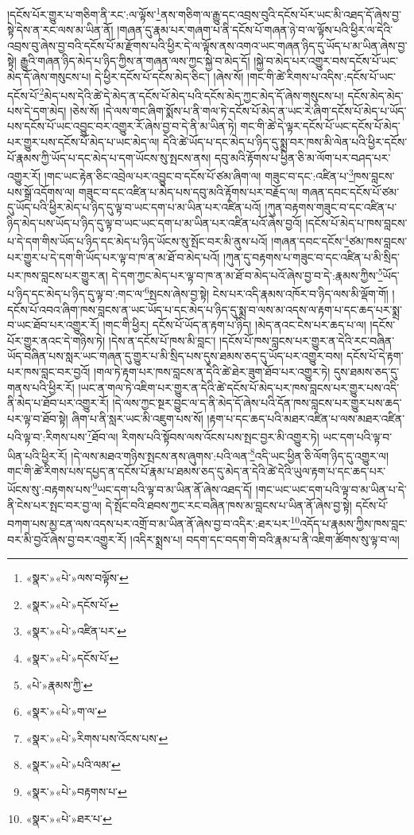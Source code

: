 །དངོས་པོར་གྱུར་པ་གཅིག་ནི་རང་:ལ་ལྟོས་\footnote{«སྣར་»«པེ་»ལས་བལྟོས་}ནས་གཅིག་ལ་རྒྱུ་དང་འབྲས་བུའི་དངོས་པོར་ཡང་མི་འཐད་དོ་ཞེས་བྱ་སྟེ་དེས་ན་རང་ལས་མ་ཡིན་ནོ། །གཞན་དུ་རྣམ་པར་གཞག་པ་ནི་དངོས་པོ་གཞན་ཉེ་བ་ལ་ལྟོས་པའི་ཕྱིར་ལ་དེའི་འབྲས་བུ་ཞེས་བྱ་བའི་དངོས་པོ་མ་རྫོགས་པའི་ཕྱིར་དེ་ལ་ལྟོས་ནས་འགའ་ཡང་གཞན་ཉིད་དུ་ཡོད་པ་མ་ཡིན་ཞེས་བྱ་སྟེ། རྒྱུའི་གཞན་ཉིད་མེད་པ་ཉིད་ཀྱིས་ན་གཞན་ལས་ཀྱང་སྐྱེ་བ་མེད་དོ། །སྐྱེ་བ་མེད་པར་འགྱུར་བས་དངོས་པོ་ཡང་མེད་དོ་ཞེས་གསུངས་པ། དེ་ཕྱིར་དངོས་པོ་དངོས་མེད་ཅིང་། །ཞེས་སོ། །གང་གི་ཚེ་རིགས་པ་འདིས་:དངོས་པོ་ཡང་དངོས་པོ་\footnote{«སྣར་»«པེ་»དངོས་པོ་}མེད་པས་དེའི་ཚེ་དེ་མེད་ན་དངོས་པོ་མེད་པའི་དངོས་མེད་ཀྱང་མེད་དོ་ཞེས་གསུངས་པ། དངོས་མེད་མེད་པས་དེ་དག་མེད། །ཅེས་སོ། །དེ་ལས་གང་ཞིག་སྨོས་པ་ནི་གལ་ཏེ་དངོས་པོ་མེད་ན་ཡང་རེ་ཞིག་དངོས་པོ་མེད་པ་ཡོད་པས་དངོས་པོ་ཡང་འབྱུང་བར་འགྱུར་རོ་ཞེས་བྱ་བ་དེ་ནི་མ་ཡིན་ཏེ། གང་གི་ཚེ་དེ་ལྟར་དངོས་པོ་ཡང་དངོས་པོ་མེད་པར་གྱུར་པས་དངོས་པོ་མེད་པ་ཡང་མེད་ལ། དེའི་ཚེ་ཡོད་པ་དང་མེད་པ་ཉིད་དུ་སྨྲ་བར་ཁས་མི་ལེན་པའི་ཕྱིར་དངོས་པོ་རྣམས་ཀྱི་ཡོད་པ་དང་མེད་པ་དག་ཡོངས་སུ་སྤངས་ནས། དབུ་མའི་རྟོགས་པ་ཕྱིན་ཅི་མ་ལོག་པར་བཤད་པར་འགྱུར་རོ། །གང་ཡང་རྟེན་ཅིང་འབྲེལ་པར་འབྱུང་བ་དངོས་པོ་ཙམ་ཞིག་ལ། གཟུང་བ་དང་:འཛིན་པ་\footnote{«སྣར་»«པེ་»འཛིན་པར་}ཁས་བླངས་པས་སྒྲོ་འདོགས་ལ། གཟུང་བ་དང་འཛིན་པ་མེད་པས་དབུ་མའི་རྟོགས་པར་བརྗོད་ལ། གཞན་དབང་དངོས་པོ་ཙམ་དུ་ཡོད་པའི་ཕྱིར་མེད་པ་ཉིད་དུ་ལྟ་བ་ཡང་དག་པ་མ་ཡིན་པར་འཛིན་པའོ། །ཀུན་བརྟགས་གཟུང་བ་དང་འཛིན་པ་ཉིད་མེད་པས་ཡོད་པ་ཉིད་དུ་ལྟ་བ་ཡང་ཡང་དག་པ་མ་ཡིན་པར་འཛིན་པའོ་ཞེས་བྱའོ། །དངོས་པོ་མེད་པ་ཁས་བླངས་པ་དེ་དག་གིས་ཡོད་པ་ཉིད་དང་མེད་པ་ཉིད་ཡོངས་སུ་སྤོང་བར་མི་ནུས་པའོ། །གཞན་དབང་དངོས་\footnote{«སྣར་»«པེ་»དངོས་པོ་}ཙམ་ཁས་བླངས་པར་གྱུར་པ་དེ་དག་གི་ཡོད་པར་ལྟ་བ་ཁ་ན་མ་ཐོ་བ་མེད་པའོ། །ཀུན་དུ་བརྟགས་པ་གཟུང་བ་དང་འཛིན་པ་མི་སྲིད་པར་ཁས་བླངས་པར་གྱུར་ན། དེ་དག་ཀྱང་མེད་པར་ལྟ་བ་ཁ་ན་མ་ཐོ་བ་མེད་པའོ་ཞེས་བྱ་བ་དེ་:རྣམས་ཀྱིས་\footnote{«པེ་»རྣམས་ཀྱི་}ཡོད་པ་ཉིད་དང་མེད་པ་ཉིད་དུ་ལྟ་བ་:གང་ལ་\footnote{«སྣར་»«པེ་»ག་ལ་}སྤངས་ཞེས་བྱ་སྟེ། ངེས་པར་འདི་རྣམས་འཁོར་བ་ཉིད་ལས་མི་ལྡོག་གོ། །དངོས་པོ་འབའ་ཞིག་ཁས་བླངས་ན་ཡང་ཡོད་པ་དང་མེད་པ་ཉིད་དུ་སྨྲ་བ་ལས་མ་འདས་ལ་རྟག་པ་དང་ཆད་པར་སྨྲ་བ་ཡང་ཐོབ་པར་འགྱུར་རོ། །གང་གི་ཕྱིར། དངོས་པོ་ཡོད་ན་རྟག་པ་ཉིད། །མེད་ནའང་ངེས་པར་ཆད་པ་ལ། །དངོས་པོར་གྱུར་ནའང་དེ་གཉིས་ཏེ། །དེས་ན་དངོས་པོ་ཁས་མི་བླང་། །དངོས་པོ་ཁས་བླངས་པར་གྱུར་ན་དེའི་རང་བཞིན་ཡོད་བཞིན་པས་སླར་ཡང་གཞན་དུ་གྱུར་པ་མི་སྲིད་པས་དུས་ཐམས་ཅད་དུ་ཡོད་པར་འགྱུར་བས། དངོས་པོ་དེ་རྟག་པར་ཁས་བླང་བར་བྱའོ། །གལ་ཏེ་རྟག་པར་ཁས་བླངས་ན་དེའི་ཚེ་ཐེར་ཟུག་ཐོབ་པར་འགྱུར་ཏེ། དུས་ཐམས་ཅད་དུ་གནས་པའི་ཕྱིར་རོ། །ཡང་ན་གལ་ཏེ་འཇིག་པར་གྱུར་ན་དེའི་ཚེ་དངོས་པོ་མེད་པར་ཁས་བླངས་པར་གྱུར་པས་འདི་ནི་མེད་པ་ཐོབ་པར་འགྱུར་རོ། །དེ་ལས་ཀྱང་སྔར་བྱུང་ལ་ད་ནི་མེད་དོ་ཞེས་པའི་དོན་ཁས་བླངས་པར་གྱུར་པས་ཆད་པར་ལྟ་བ་ཐོབ་སྟེ། ཞིག་པ་ནི་སླར་ཡང་མི་འཇུག་པས་སོ། །རྟག་པ་དང་ཆད་པའི་མཐར་འཛིན་པ་ལས་མཐར་འཛིན་པའི་ལྟ་བ་:རིགས་པས་\footnote{«སྣར་»«པེ་»རིགས་པས་འོངས་པས་}ཐོབ་ལ། རིགས་པའི་སྟོབས་ལས་འོངས་པས་སྤང་བྱར་མི་འགྱུར་ཏེ། ཡང་དག་པའི་ལྟ་བ་ཡིན་པའི་ཕྱིར་རོ། །དེ་ལས་མཐའ་གཉིས་སྤངས་ནས་ཞུགས་:པའི་ལན་\footnote{«སྣར་»«པེ་»པའི་ལམ་}འདི་ཡང་ཕྱིན་ཅི་ལོག་ཉིད་དུ་འགྱུར་ལ། གང་གི་ཚེ་རིགས་པས་དཔྱད་ན་དངོས་པོ་རྣམ་པ་ཐམས་ཅད་དུ་མེད་ན་དེའི་ཚེ་དེའི་ཡུལ་རྟག་པ་དང་ཆད་པར་ཡོངས་སུ་:བརྟགས་པས་\footnote{«སྣར་»«པེ་»བརྟགས་པ་}ཡང་དག་པའི་ལྟ་བ་མ་ཡིན་ནོ་ཞེས་འཐད་དོ། །གང་ཡང་ཡང་དག་པའི་ལྟ་བ་མ་ཡིན་པ་དེ་ནི་ངེས་པར་སྤང་བར་བྱ་ལ། དེ་སྤོང་བའི་ཐབས་ཀྱང་རང་བཞིན་ཁས་མ་བླངས་པ་ཡིན་ནོ་ཞེས་བྱ་སྟེ། དངོས་པོ་བཀག་པས་མྱ་ངན་ལས་འདས་པར་འགྲོ་བ་མ་ཡིན་ནོ་ཞེས་བྱ་བ་འདིར་:ཐར་པར་\footnote{«སྣར་»«པེ་»ཐར་པ་}འདོད་པ་རྣམས་ཀྱིས་ཁས་བླང་བར་མི་བྱའོ་ཞེས་བྱ་བར་འགྱུར་རོ། །འདིར་སྨྲས་པ། བདག་དང་བདག་གི་བའི་རྣམ་པ་ནི་འཇིག་ཚོགས་སུ་ལྟ་བ་ལ། 